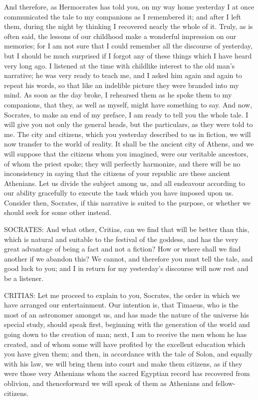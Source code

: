 And therefore, as Hermocrates has told you, on my way home yesterday I at
once communicated the tale to my companions as I remembered it; and after
I left them, during the night by thinking I recovered nearly the whole of
it. Truly, as is often said, the lessons of our childhood make a wonderful
impression on our memories; for I am not sure that I could remember all
the discourse of yesterday, but I should be much surprised if I forgot any
of these things which I have heard very long ago. I listened at the time
with childlike interest to the old man’s narrative; he was very ready to
teach me, and I asked him again and again to repeat his words, so that
like an indelible picture they were branded into my mind. As soon as the
day broke, I rehearsed them as he spoke them to my companions, that they,
as well as myself, might have something to say. And now, Socrates, to make
an end of my preface, I am ready to tell you the whole tale. I will give
you not only the general heads, but the particulars, as they were told to
me. The city and citizens, which you yesterday described to us in fiction,
we will now transfer to the world of reality. It shall be the ancient city
of Athens, and we will suppose that the citizens whom you imagined, were
our veritable ancestors, of whom the priest spoke; they will perfectly
harmonize, and there will be no inconsistency in saying that the citizens
of your republic are these ancient Athenians. Let us divide the subject
among us, and all endeavour according to our ability gracefully to execute
the task which you have imposed upon us. Consider then, Socrates, if this
narrative is suited to the purpose, or whether we should seek for some
other instead.

SOCRATES: And what other, Critias, can we find that will be better than
this, which is natural and suitable to the festival of the goddess, and
has the very great advantage of being a fact and not a fiction? How or
where shall we find another if we abandon this? We cannot, and therefore
you must tell the tale, and good luck to you; and I in return for my
yesterday’s discourse will now rest and be a listener.

CRITIAS: Let me proceed to explain to you, Socrates, the order in which we
have arranged our entertainment. Our intention is, that Timaeus, who is
the most of an astronomer amongst us, and has made the nature of the
universe his special study, should speak first, beginning with the
generation of the world and going down to the creation of man; next, I am
to receive the men whom he has created, and of whom some will have
profited by the excellent education which you have given them; and then,
in accordance with the tale of Solon, and equally with his law, we will
bring them into court and make them citizens, as if they were those very
Athenians whom the sacred Egyptian record has recovered from oblivion, and
thenceforward we will speak of them as Athenians and fellow-citizens.

